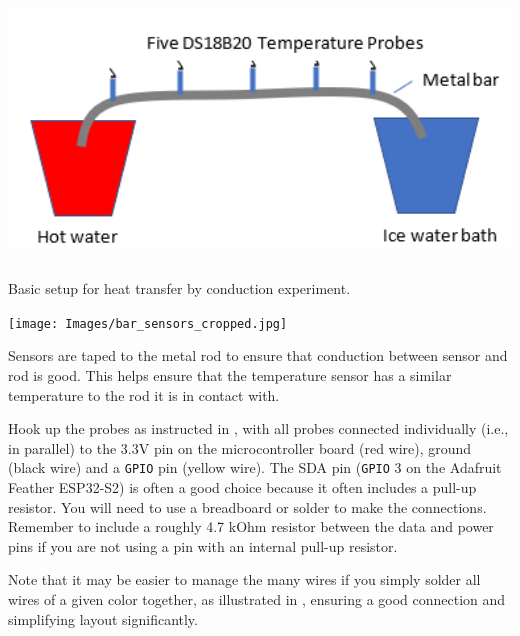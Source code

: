 \begin{marginfigure}[-5cm]
	\begin{center}
		\includegraphics[height=7cm]{Images/diffusion_experiment.png}
		\caption[Diffusion Experiment]{Basic setup for heat transfer by conduction experiment.}
	\end{center}
\end{marginfigure}

\begin{marginfigure}[3cm]
	\begin{center}
		\texttt{[image: Images/bar\_sensors\_cropped.jpg]}
		\caption[Sensors on Metal Rod]{Sensors are taped to the metal rod to ensure that conduction between sensor and rod is good. This helps ensure that the temperature sensor has a similar temperature to the rod it is in contact with.}
	\end{center}
\end{marginfigure}


Hook up the probes as instructed in , with all probes connected individually (i.e., in parallel) to the 3.3V pin on the microcontroller board (red wire), ground (black wire) and a \texttt{GPIO} pin (yellow wire).
The SDA pin (\texttt{GPIO} 3 on the Adafruit Feather ESP32-S2) is often a good choice because it often includes a pull-up resistor.
You will need to use a breadboard or solder to make the connections.
Remember to include a roughly 4.7 kOhm resistor between the data and power pins if you are not using a pin with an internal pull-up resistor.
 
Note that it may be easier to manage the many wires if you simply solder all wires of a given color together, as illustrated in , ensuring a good connection and simplifying layout significantly.


